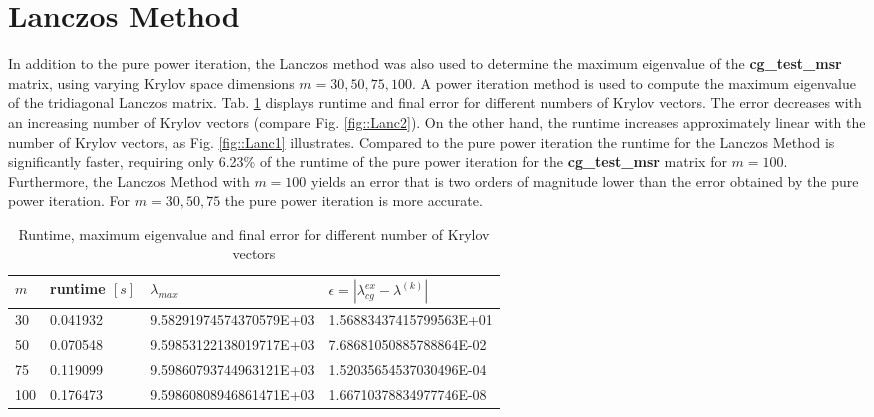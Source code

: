 \documentclass[11pt,a4paper]{article}
\newcommand{\refFig}[1]{Fig. \ref{#1}}
\newcommand{\refTab}[1]{Tab. \ref{#1}}
\begin{document}
\section{Lanczos Method}
In addition to the pure power iteration, the Lanczos method was also used to determine the maximum eigenvalue of the \textbf{cg\_test\_msr} matrix, using varying Krylov space dimensions $m = 30,50,75,100$. A power iteration method is used to compute the  maximum eigenvalue of the tridiagonal Lanczos matrix. \refTab{tab:Lanc} displays runtime and final error for different numbers of Krylov vectors. The error decreases with an increasing number of Krylov vectors (compare \refFig{fig::Lanc2}). On the other hand, the runtime increases approximately linear with the number of Krylov vectors, as \refFig{fig::Lanc1} illustrates. 
Compared to the pure power iteration the runtime for the Lanczos Method is significantly faster, requiring only 6.23\% of the runtime of the pure power iteration for the \textbf{cg\_test\_msr} matrix for $m=100$. Furthermore, the Lanczos Method with $m=100$ yields an error that is two orders of magnitude lower than the error obtained by the pure power iteration. For $m=30,50,75$ the pure power iteration is more accurate.

\newpage
\renewcommand{\arraystretch}{2}
\begin{table}[h!]
	\begin{center}
		\begin{tabular}{ p{2cm} p{2cm} p{5cm} p{5cm}}
			\hline
			\hline
			$m$ & runtime $[s]$ & $\lambda_{max}$ & $\epsilon = |\lambda_{cg}^{ex} - \lambda^{(k)}|$ \\
			\hline
			\hline
			30 & 0.041932  & 9.58291974574370579E+03 & 1.56883437415799563E+01\\
			\hline
			50 & 0.070548  & 9.59853122138019717E+03 & 7.68681050885788864E-02\\
			\hline
			75 & 0.119099  & 9.59860793744963121E+03 & 1.52035654537030496E-04\\
			\hline
			100 & 0.176473   & 9.59860808946861471E+03  & 1.66710378834977746E-08\\
			\hline
			\hline
		\end{tabular}
		\caption{\label{tab:Lanc}  Runtime, maximum eigenvalue and final error for different number of Krylov vectors}
	\end{center}
\end{table}
\renewcommand{\arraystretch}{1}
\end{document}

